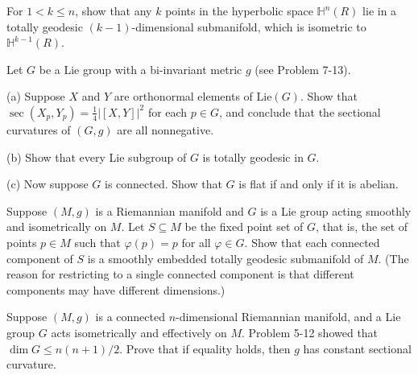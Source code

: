 \begin{exercise}
\label{prob:k-points-hyperbolic-geodesic}
For $1 < k \leq n$, show that any $k$ points in the hyperbolic space $\mathbb{H}^n(R)$ lie in a totally geodesic $(k-1)$-dimensional submanifold, which is isometric to $\mathbb{H}^{k-1}(R)$.
\end{exercise}

\begin{exercise}
\label{prob:lie-group-bi-invariant-metric-ch8}
Let $G$ be a Lie group with a bi-invariant metric $g$ (see Problem 7-13).

(a) Suppose $X$ and $Y$ are orthonormal elements of $\text{Lie}(G)$. Show that $\sec(X_p, Y_p) = \frac{1}{4}|[X, Y]|^2$ for each $p \in G$, and conclude that the sectional curvatures of $(G, g)$ are all nonnegative.

(b) Show that every Lie subgroup of $G$ is totally geodesic in $G$.

(c) Now suppose $G$ is connected. Show that $G$ is flat if and only if it is abelian.
\end{exercise}

\begin{exercise}
\label{prob:lie-group-fixed-point-geodesic}
Suppose $(M, g)$ is a Riemannian manifold and $G$ is a Lie group acting smoothly and isometrically on $M$. Let $S \subseteq M$ be the fixed point set of $G$, that is, the set of points $p \in M$ such that $\varphi(p) = p$ for all $\varphi \in G$. Show that each connected component of $S$ is a smoothly embedded totally geodesic submanifold of $M$. (The reason for restricting to a single connected component is that different components may have different dimensions.)
\end{exercise}

\begin{exercise}
\label{prob:lie-group-isometric-action-dimension}
Suppose $(M,g)$ is a connected $n$-dimensional Riemannian manifold, and a Lie group $G$ acts isometrically and effectively on $M$. Problem 5-12 showed that $\dim G \le n(n+1)/2$. Prove that if equality holds, then $g$ has constant sectional curvature.
\end{exercise}


